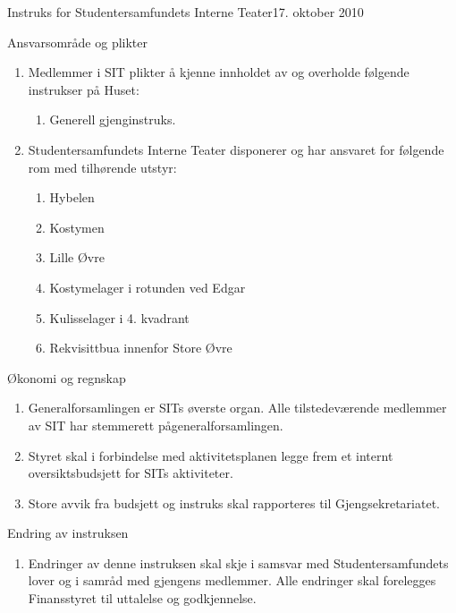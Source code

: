 \begin{instruks}{Instruks for Studentersamfundets Interne Teater}{17. oktober 2010}{ }
    \begin{instruksledd}{Ansvarsområde og plikter}
        \begin{enumerate}   
            \item  Medlemmer i SIT plikter å kjenne innholdet av og overholde følgende instrukser på
                Huset:
                \begin{enumerate}
                    \item Generell gjenginstruks.
                \end{enumerate}
            \item Studentersamfundets Interne Teater disponerer og har ansvaret for følgende rom med
                tilhørende utstyr:
                \begin{enumerate}
                    \item Hybelen
                    \item Kostymen
                    \item Lille Øvre
                    \item Kostymelager i rotunden ved Edgar
                    \item Kulisselager i 4. kvadrant
                    \item Rekvisittbua innenfor Store Øvre
                \end{enumerate}
        \end{enumerate}
    \end{instruksledd}

    \begin{instruksledd}{Økonomi og regnskap}
        \begin{enumerate}
            \item Generalforsamlingen er SITs øverste organ. Alle tilstedeværende
                medlemmer av SIT har stemmerett pågeneralforsamlingen. 
            \item Styret skal i forbindelse med aktivitetsplanen legge frem et
                internt oversiktsbudsjett for SITs aktiviteter.
            \item Store avvik fra budsjett og instruks skal rapporteres til
                Gjengsekretariatet.
        \end{enumerate}  
    \end{instruksledd}

    \begin{instruksledd} Endring av instruksen
        \begin{enumerate}
            \item Endringer av denne instruksen skal skje i samsvar med
                Studentersamfundets lover og i samråd med gjengens medlemmer. Alle endringer skal forelegges
                Finansstyret til uttalelse og godkjennelse.		
        \end{enumerate}  
    \end{instruksledd}


\end{instruks}
